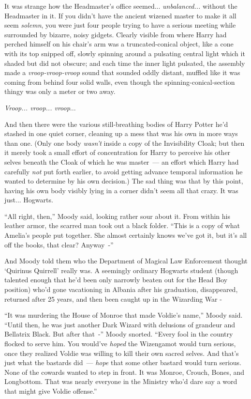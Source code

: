 It was strange how the Headmaster's office seemed... \emph{unbalanced...} without the Headmaster in it. If you didn't have the ancient wizened master to make it all seem \emph{solemn}, you were just four people trying to have a serious meeting while surrounded by bizarre, noisy gidgets. Clearly visible from where Harry had perched himself on his chair's arm was a truncated-conical object, like a cone with its top snipped off, slowly spinning around a pulsating central light which it shaded but did not obscure; and each time the inner light pulsated, the assembly made a \emph{vroop-vroop-vroop} sound that sounded oddly distant, muffled like it was coming from behind four solid walls, even though the spinning-conical-section thingy was only a meter or two away.

\emph{Vroop... vroop... vroop}...

And then there were the various still-breathing bodies of Harry Potter he'd stashed in one quiet corner, cleaning up a mess that was his own in more ways than one. (Only one body \emph{wasn't} inside a copy of the Invisibility Cloak; but then it merely took a small effort of concentration for Harry to perceive his other selves beneath the Cloak of which he was master~--- an effort which Harry had carefully \emph{not} put forth earlier, to avoid getting advance temporal information he wanted to determine by his own decision.) The sad thing was that by this point, having his own body visibly lying in a corner didn't seem all that crazy. It was just... Hogwarts.

``All right, then,'' Moody said, looking rather sour about it. From within his leather armor, the scarred man took out a black folder. ``This is a copy of what Amelia's people put together. She almost certainly knows we've got it, but it's all off the books, that clear? Anyway~-''

And Moody told them who the Department of Magical Law Enforcement thought `Quirinus Quirrell' really was. A seemingly ordinary Hogwarts student (though talented enough that he'd been only narrowly beaten out for the Head Boy position) who'd gone vacationing in Albania after his graduation, disappeared, returned after 25 years, and then been caught up in the Wizarding War -

``It was murdering the House of Monroe that made Voldie's name,'' Moody said. ``Until then, he was just another Dark Wizard with delusions of grandeur and Bellatrix Black. But after that~-'' Moody snorted. ``Every fool in the country flocked to serve him. You would've \emph{hoped} the Wizengamot would turn serious, once they realized Voldie was willing to kill their own sacred selves. And that's just what the bastards did~--- \emph{hope} that some other bastard would turn serious. None of the cowards wanted to step in front. It was Monroe, Crouch, Bones, and Longbottom. That was nearly everyone in the Ministry who'd dare say a word that might give Voldie offense.''

